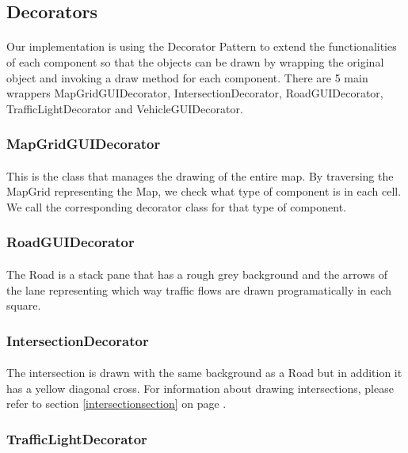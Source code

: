 \documentclass[a4paper,11pt,titlepage]{article}
\begin{document}
\subsection{Decorators}
\paragraph{}
Our implementation is using the Decorator Pattern to extend the functionalities of each component so that the objects can be drawn by wrapping the original object and invoking a draw method for each component. There are 5 main wrappers MapGridGUIDecorator, IntersectionDecorator, RoadGUIDecorator, TrafficLightDecorator and VehicleGUIDecorator.
\subsubsection{MapGridGUIDecorator}
\paragraph{}
This is the class that manages the drawing of the entire map. By traversing the MapGrid representing the Map, we check what type of component is in each cell. We call the corresponding decorator class for that type of component. 
\subsubsection{RoadGUIDecorator}
\paragraph{}
The Road is a stack pane that has a rough grey background and the arrows of the lane representing which way traffic flows are drawn programatically in each square.
\subsubsection{IntersectionDecorator}
\paragraph{}
The intersection is drawn with the same background as a Road but in addition it has a yellow diagonal cross. For information about drawing intersections, please refer to section \ref{intersectionsection} on page \pageref{intersectionsection}.
\subsubsection{TrafficLightDecorator}
\end{document}
